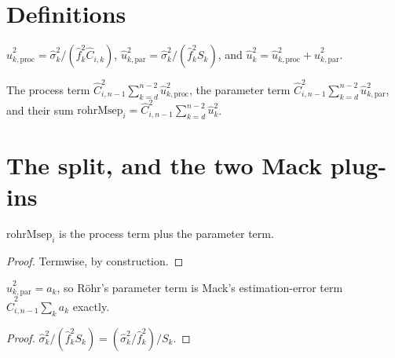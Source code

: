 \section{Definitions}

\begin{definition}\label{def:rohrRel}\leanok
{}
$\hat u_{k,\mathrm{proc}}^2 = \hat\sigma_k^2/(\hat f_k^2 \hat C_{i,k})$,
$\hat u_{k,\mathrm{par}}^2 = \hat\sigma_k^2/(\hat f_k^2 S_k)$, and
$\hat u_k^2 = \hat u_{k,\mathrm{proc}}^2 + \hat u_{k,\mathrm{par}}^2$.
\end{definition}

\begin{definition}\label{def:rohrMsep}\leanok
{}
The process term $\hat C_{i,n-1}^2 \sum_{k=d}^{n-2}\hat u_{k,\mathrm{proc}}^2$, the parameter
term $\hat C_{i,n-1}^2 \sum_{k=d}^{n-2}\hat u_{k,\mathrm{par}}^2$, and their sum
$\mathrm{rohrMsep}_i = \hat C_{i,n-1}^2 \sum_{k=d}^{n-2}\hat u_k^2$.
\end{definition}

\section{The split, and the two Mack plug-ins}

\begin{lemma}\label{lem:rohrSplit}\leanok
{}
$\mathrm{rohrMsep}_i$ is the process term plus the parameter term.
\end{lemma}
\begin{proof}\leanok Termwise, by construction. \end{proof}

\begin{lemma}\label{lem:rohrParam}\leanok
{}
$\hat u_{k,\mathrm{par}}^2 = a_k$, so R\"ohr's parameter term is Mack's estimation-error term
$\hat C_{i,n-1}^2 \sum_k a_k$ exactly.
\end{lemma}
\begin{proof}\leanok $\hat\sigma_k^2/(\hat f_k^2 S_k) = (\hat\sigma_k^2/\hat f_k^2)/S_k$. \end{proof}

